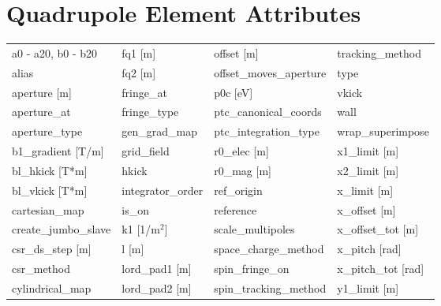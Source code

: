  \section{Quadrupole Element Attributes}
 \label{s:list.quadrupole}
 
 \begin{tabular}{llll} \toprule
a0 - a20, b0 - b20               & fq1 [m]                          & offset [m]                       & tracking_method                  \\
alias                            & fq2 [m]                          & offset_moves_aperture            & type                             \\
aperture [m]                     & fringe_at                        & p0c [eV]                         & vkick                            \\
aperture_at                      & fringe_type                      & ptc_canonical_coords             & wall                             \\
aperture_type                    & gen_grad_map                     & ptc_integration_type             & wrap_superimpose                 \\
b1_gradient [T/m]                & grid_field                       & r0_elec [m]                      & x1_limit [m]                     \\
bl_hkick [T*m]                   & hkick                            & r0_mag [m]                       & x2_limit [m]                     \\
bl_vkick [T*m]                   & integrator_order                 & ref_origin                       & x_limit [m]                      \\
cartesian_map                    & is_on                            & reference                        & x_offset [m]                     \\
create_jumbo_slave               & k1 [1/m$^2$]                     & scale_multipoles                 & x_offset_tot [m]                 \\
csr_ds_step [m]                  & l [m]                            & space_charge_method              & x_pitch [rad]                    \\
csr_method                       & lord_pad1 [m]                    & spin_fringe_on                   & x_pitch_tot [rad]                \\
cylindrical_map                  & lord_pad2 [m]                    & spin_tracking_method             & y1_limit [m]                     \\

\end{tabular}
